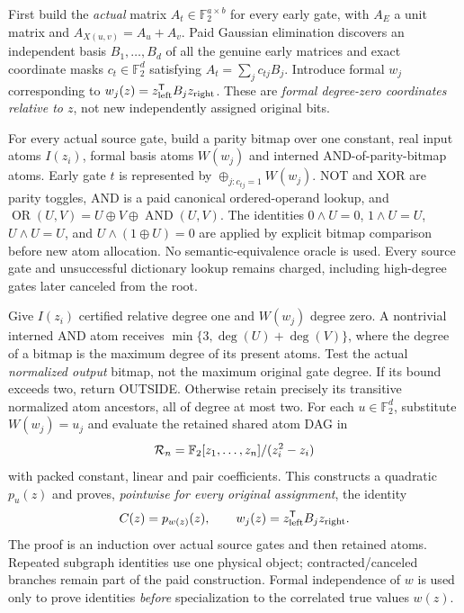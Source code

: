 \documentclass[11pt]{article}
\begin{document}
First build the \emph{actual} matrix $A_t\in\mathbb F_2^{a\times b}$
for every early gate, with $A_E$ a unit matrix and
$A_{X(u,v)}=A_u+A_v$. Paid Gaussian elimination discovers an independent
basis $B_1,\ldots,B_d$ of all the genuine early matrices and exact
coordinate masks $c_t\in\mathbb F_2^d$ satisfying
$A_t=\sum_jc_{tj}B_j$. Introduce formal $w_j$ corresponding to
$w_j(z)=z_{\rm left}^{\mathsf T}B_jz_{\rm right}$.
These are \emph{formal degree-zero coordinates relative to $z$},
not new independently assigned original bits.

For every actual source gate, build a parity bitmap over one constant,
real input atoms $I(z_i)$, formal basis atoms $W(w_j)$ and interned
AND-of-parity-bitmap atoms. Early gate $t$ is represented by
$\oplus_{j:c_{tj}=1}W(w_j)$. NOT and XOR are parity toggles,
AND is a paid canonical ordered-operand lookup, and
$\operatorname{OR}(U,V)=U\oplus V\oplus\operatorname{AND}(U,V)$.
The identities $0\land U=0$, $1\land U=U$, $U\land U=U$,
and $U\land(1\oplus U)=0$ are applied by explicit bitmap comparison
before new atom allocation. No semantic-equivalence oracle is
used. Every source gate and unsuccessful dictionary lookup remains
charged, including high-degree gates later canceled from the root.

Give $I(z_i)$ certified relative degree one and $W(w_j)$ degree zero.
A nontrivial interned AND atom receives
$\min\{3,\deg(U)+\deg(V)\}$, where the degree of a bitmap is
the maximum degree of its present atoms. Test the actual
\emph{normalized output} bitmap, not the maximum original gate
degree. If its bound exceeds two, return OUTSIDE. Otherwise
retain precisely its transitive normalized atom ancestors, all of
degree at most two. For each $u\in\mathbb F_2^d$, substitute
$W(w_j)=u_j$ and evaluate the retained shared atom DAG in
\[
{\cal R}_n=\mathbb F_2[z_1,\ldots,z_n]/(z_i^2-z_i)
\]
with packed constant, linear and pair coefficients. This constructs
a quadratic $p_u(z)$ and proves, \emph{pointwise for every original
assignment}, the identity
\[
C(z)=p_{w(z)}(z),\qquad
w_j(z)=z_{\rm left}^{\mathsf T}B_jz_{\rm right}.
\]
The proof is an induction over actual source gates and then retained
atoms. Repeated subgraph identities use one physical object;
contracted/canceled branches remain part of the paid construction.
Formal independence of $w$ is used only to prove identities
\emph{before} specialization to the correlated true values $w(z)$.
\end{document}
